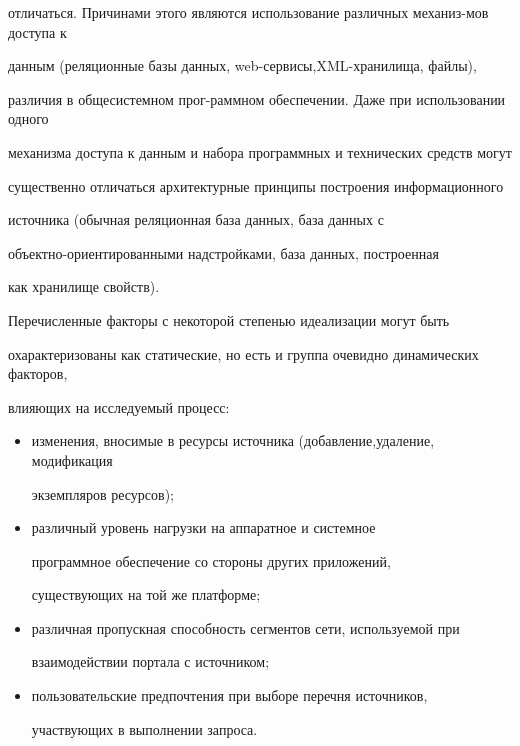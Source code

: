 отличаться. Причинами этого являются использование различных ме\-ха\-низ-\linebreak мов доступа к 


данным (реляционные базы данных, web-сер\-ви\-сы,\linebreak XML-хра\-ни\-ли\-ща, файлы), 


различия в общесистемном прог-\linebreak раммном обеспечении. Даже при использовании одного 


механизма доступа к данным и набора программных и технических средств могут 


существенно отличаться архитектурные принципы построения информационного 


источника (обычная реляционная база данных, база данных с 


объект\-но-ори\-ен\-ти\-ро\-ван\-ны\-ми надстройками, база данных, построенная 


как хранилище свойств).


      


      Перечисленные факторы с некоторой степенью идеализации могут быть 


охарактеризованы как статические, но есть и группа очевидно динамических факторов, 


влияющих на исследуемый процесс:


      \begin{itemize}


\item изменения, вносимые в ресурсы источника (добавление,\linebreak удаление, модификация 


экземпляров ресурсов);


\item различный уровень нагрузки на аппаратное и системное 


программное обеспечение со стороны других приложений, 


существующих на той же платформе;


\item различная пропускная способность сегментов сети, используемой при 


взаимодействии портала с источником;


\item пользовательские предпочтения при выборе перечня источников, 


участвующих в выполнении запроса.


\end{itemize}





